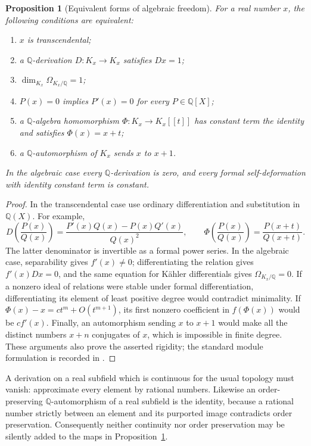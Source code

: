 \documentclass[11pt,a4paper]{article}
\newcommand{\Q}{\mathbb Q}
\newtheorem{proposition}[theorem]{Proposition}
\theoremstyle{definition}
\theoremstyle{remark}
\numberwithin{equation}{section}
\begin{document}
\begin{proposition}[Equivalent forms of algebraic freedom]\label{wr:prop-freedom}
For a real number \(x\), the following conditions are equivalent:
\begin{enumerate}
\item \(x\) is transcendental;
\item a \(\Q\)-derivation \(D:K_x\to K_x\) satisfies \(Dx=1\);
\item \(\dim_{K_x}\Omega_{K_x/\Q}=1\);
\item \(P(x)=0\) implies \(P'(x)=0\) for every \(P\in\Q[X]\);
\item a \(\Q\)-algebra homomorphism \(\Phi:K_x\to K_x[[t]]\) has constant
term the identity and satisfies \(\Phi(x)=x+t\);
\item a \(\Q\)-automorphism of \(K_x\) sends \(x\) to \(x+1\).
\end{enumerate}
In the algebraic case every \(\Q\)-derivation is zero, and every formal
self-deformation with identity constant term is constant.
\end{proposition}
\begin{proof}
In the transcendental case use ordinary differentiation and substitution
in \(\Q(X)\). For example,
\[
 D\!\left(\frac{P(x)}{Q(x)}\right)
 =\frac{P'(x)Q(x)-P(x)Q'(x)}{Q(x)^2},\qquad
 \Phi\!\left(\frac{P(x)}{Q(x)}\right)
 =\frac{P(x+t)}{Q(x+t)}.
\]
The latter denominator is invertible as a formal power series. In the
algebraic case, separability gives \(f'(x)\ne0\); differentiating the
relation gives \(f'(x)Dx=0\), and the same equation for K\"ahler
differentials gives \(\Omega_{K_x/\Q}=0\). If a nonzero ideal of relations
were stable under formal differentiation, differentiating its element of
least positive degree would contradict minimality. If
\(\Phi(x)-x=ct^m+O(t^{m+1})\), its first nonzero coefficient in
\(f(\Phi(x))\) would be \(cf'(x)\). Finally, an automorphism sending
\(x\) to \(x+1\) would make all the distinct numbers \(x+n\) conjugates
of \(x\), which is impossible in finite degree. These arguments also
prove the asserted rigidity; the standard module formulation is recorded
in \cite{wr:stacks-differentials,wr:stacks-etale}.
\end{proof}

A derivation on a real subfield which is continuous for the usual topology
must vanish: approximate every element by rational numbers. Likewise an
order-preserving \(\Q\)-automorphism of a real subfield is the identity,
because a rational number strictly between an element and its purported
image contradicts order preservation. Consequently neither continuity
nor order preservation may be silently added to the maps in
Proposition~\ref{wr:prop-freedom}.
\end{document}
